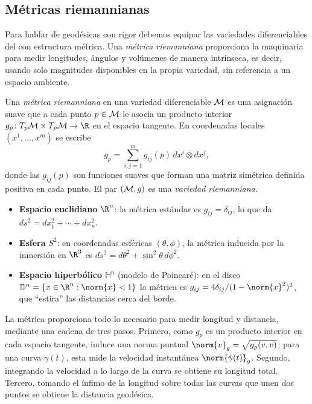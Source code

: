 \subsection{M\'etricas riemannianas}
\label{subsec:geo:metrics}

Para hablar de geod\'esicas con rigor debemos equipar las variedades
diferenciables del  con estructura m\'etrica. Una
\emph{m\'etrica riemanniana} proporciona la maquinaria para medir longitudes,
\'angulos y vol\'umenes de manera intr\'inseca, es decir, usando solo magnitudes
disponibles en la propia variedad, sin referencia a un espacio ambiente.

\begin{definition}
\label{def:geo:metric}
Una \emph{m\'etrica riemanniana} en una variedad diferenciable $\mathcal{M}$ es una
asignaci\'on suave que a cada punto $p \in \mathcal{M}$ le asocia un producto interior
$g_p \colon \TpM \times \TpM \to \R$ en el espacio tangente. En coordenadas
locales $(x^1, \dots, x^m)$ se escribe
\[
  g_p = \sum_{i,j=1}^m g_{ij}(p)\, dx^i \otimes dx^j ,
\]
donde las $g_{ij}(p)$ son funciones suaves que forman una matriz sim\'etrica
definida positiva en cada punto. El par $(\mathcal{M}, g)$ es una \emph{variedad
riemanniana}.
\end{definition}

\begin{example}
\label{ex:geo:metrics}
\leavevmode
\begin{itemize}
  \item \textbf{Espacio euclidiano} $\R^n$: la m\'etrica est\'andar es
    $g_{ij} = \delta_{ij}$, lo que da $ds^2 = dx_1^2 + \cdots + dx_n^2$.
  \item \textbf{Esfera} $S^2$: en coordenadas esf\'ericas $(\theta, \phi)$, la
    m\'etrica inducida por la inmersi\'on en $\R^3$ es
    $ds^2 = d\theta^2 + \sin^2\theta\, d\phi^2$.
  \item \textbf{Espacio hiperb\'olico} $\mathbb{H}^n$ (modelo de Poincar\'e): en
    el disco $\mathbb{D}^n = \{x \in \R^n : \norm{x} < 1\}$ la m\'etrica es
    $g_{ij} = 4\delta_{ij} / (1 - \norm{x}^2)^2$, que ``estira'' las distancias
    cerca del borde.
\end{itemize}
\end{example}

La m\'etrica proporciona todo lo necesario para medir longitud y distancia,
mediante una cadena de tres pasos. Primero, como $g_p$ es un producto interior
en cada espacio tangente, induce una norma puntual $\norm{v}_g = \sqrt{g_p(v,v)}$;
para una curva $\gamma(t)$, esta mide la velocidad instant\'anea
$\norm{\dot\gamma(t)}_g$. Segundo, integrando la velocidad a lo largo de la
curva se obtiene su longitud total. Tercero, tomando el \'infimo de la longitud
sobre todas las curvas que unen dos puntos se obtiene la distancia geod\'esica.

